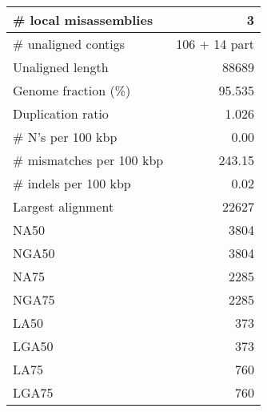 \documentclass[12pt,a4paper]{article}
\begin{document}
\begin{table}[ht]
\begin{center}
\begin{tabular}{|l*{1}{|r}|}
\# local misassemblies & 3 \\ \hline
\# unaligned contigs & 106 + 14 part \\ \hline
Unaligned length & 88689 \\ \hline
Genome fraction (\%) & 95.535 \\ \hline
Duplication ratio & 1.026 \\ \hline
\# N's per 100 kbp & 0.00 \\ \hline
\# mismatches per 100 kbp & 243.15 \\ \hline
\# indels per 100 kbp & 0.02 \\ \hline
Largest alignment & 22627 \\ \hline
NA50 & 3804 \\ \hline
NGA50 & 3804 \\ \hline
NA75 & 2285 \\ \hline
NGA75 & 2285 \\ \hline
LA50 & 373 \\ \hline
LGA50 & 373 \\ \hline
LA75 & 760 \\ \hline
LGA75 & 760 \\ \hline
\end{tabular}
\end{center}
\end{table}
\end{document}
